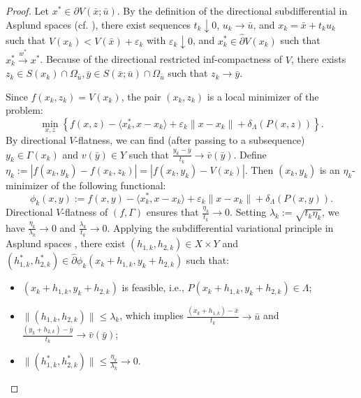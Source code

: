 \documentclass[12pt,twoside,reqno]{amsart}
\theoremstyle{definition}
\numberwithin{equation}{section}
\begin{document}
\begin{proof}
Let $x^* \in \partial V(\bar{x}; \bar u)$. By the definition of the directional subdifferential in Asplund spaces (cf. \cite[Theorem 2.34]{Mordukhovich2006variational}), there exist sequences $t_k \downarrow 0$, $u_k \to \bar u$, and $x_k = \bar{x} + t_k u_k$ such that $V(x_k) < V(\bar{x}) + \varepsilon_k$ with $\varepsilon_k \downarrow 0$, and $x_k^* \in \hat{\partial} V(x_k)$ such that $x_k^* \xrightarrow{w^*} x^*$. Because of the directional restricted inf-compactness of $V$, there exists $z_k \in S(x_k) \cap \Omega_{\bar u}, \bar y\in S(\bar{x};\bar u)\cap \Omega_{\bar u}$ such that $z_k \to \bar{y}$. 

Since $f(x_k, z_k) = V(x_k)$, the pair $(x_k, z_k)$ is a local minimizer of the problem:
\begin{equation*}
    \min_{x, z} \left\{ f(x, z) - \langle x_k^*, x - x_k \rangle + \varepsilon_k \|x - x_k\| + \delta_\Lambda(P(x, z)) \right\}.
\end{equation*}
By directional $V$-flatness, we can find (after passing to a subsequence) $y_k \in \Gamma(x_k)$ and $v(\bar y)\in Y$ such that $\frac{y_k - \bar{y}}{t_k} \to \bar v(\bar y)$. Define 
$\eta_k := |f(x_k, y_k) - f(x_k, z_k)| = |f(x_k, y_k) - V(x_k)|$. 
Then $(x_k, y_k)$ is an $\eta_k$-minimizer of the following functional:
\begin{equation*}
    \phi_k(x, y) := f(x, y) - \langle x_k^*, x - x_k \rangle + \varepsilon_k \|x - x_k\| + \delta_\Lambda(P(x, y)).
\end{equation*}
Directional $V$-flatness of $(f, \Gamma)$ ensures that $\frac{\eta_k}{t_k} \to 0$. Setting $\lambda_k := \sqrt{t_k \eta_k}$, we have $\frac{\eta_k}{\lambda_k} \to 0$ and $\frac{\lambda_k}{t_k} \to 0$. Applying the subdifferential variational principle in Asplund spaces \cite[Theorem~2.28]{Mordukhovich2006variational}, there exist $(h_{1,k}, h_{2,k}) \in X \times Y$ and $(h_{1,k}^*, h_{2,k}^*) \in \hat{\partial} \phi_k(x_k + h_{1,k}, y_k + h_{2,k})$ such that:
\begin{itemize}
    \item[(1)] $(x_k + h_{1,k}, y_k + h_{2,k})$ is feasible, i.e., $P(x_k + h_{1,k}, y_k + h_{2,k}) \in \Lambda$;
    \item[(2)] $\|(h_{1,k}, h_{2,k})\| \leq \lambda_k$, which implies $\frac{(x_k + h_{1,k}) - \bar{x}}{t_k} \to \bar u$ and $\frac{(y_k + h_{2,k}) - \bar{y}}{t_k} \to \bar v(\bar y)$;
    \item[(3)] $\|(h_{1,k}^*, h_{2,k}^*)\| \leq \frac{\eta_k}{\lambda_k} \to 0$.
\end{itemize}


\end{proof}
\end{document}
